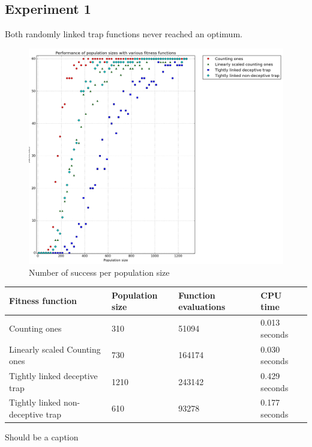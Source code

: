 \documentclass[12pt]{article}
\theoremstyle{definition}
\begin{document}
\subsection*{Experiment 1}
Both randomly linked trap functions never reached an optimum.

\begin{figure}[H]
    \centering
    \includegraphics[totalheight=0.7\textheight]{images/exp1.png}
    \caption{Number of success per population size}
\label{fig:exp1}
\end{figure}

\begin{adjustwidth}{-1cm}{}
\begin{minipage}{\linewidth}
\centering
{}
\label{tab:title}
\begin{tabular}{llll}
\toprule[1.5pt]
\bf Fitness function & \bf Population size & \bf Function evaluations & \bf CPU time\\\midrule
Counting ones & 310 & 51094 & 0.013 seconds \\
Linearly scaled Counting ones & 730 & 164174 & 0.030 seconds \\
Tightly linked deceptive trap & 1210 & 243142 & 0.429 seconds \\
Tightly linked non-deceptive trap & 610 & 93278 & 0.177 seconds \\
\bottomrule[1.25pt]
\end{tabular}\par
\bigskip
Should be a caption
\end{minipage}
\end{adjustwidth}
\end{document}
